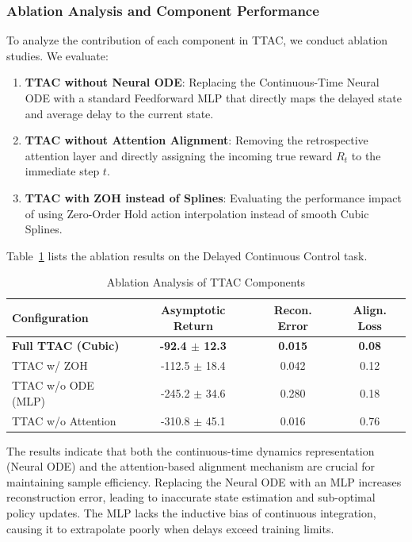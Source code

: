 \documentclass[manuscript, screen, review]{jair}
\begin{document}
\subsubsection{Ablation Analysis and Component Performance}
To analyze the contribution of each component in TTAC, we conduct ablation studies. We evaluate:
\begin{enumerate}
    \item \textbf{TTAC without Neural ODE}: Replacing the Continuous-Time Neural ODE with a standard Feedforward MLP that directly maps the delayed state and average delay to the current state.
    \item \textbf{TTAC without Attention Alignment}: Removing the retrospective attention layer and directly assigning the incoming true reward $R_t$ to the immediate step $t$.
    \item \textbf{TTAC with ZOH instead of Splines}: Evaluating the performance impact of using Zero-Order Hold action interpolation instead of smooth Cubic Splines.
\end{enumerate}

Table~\ref{tab:ablation} lists the ablation results on the Delayed Continuous Control task.

\begin{table}[!htbp]
\centering
\caption{Ablation Analysis of TTAC Components}
\label{tab:ablation}
\vskip 0.1in
\begin{small}
\begin{tabular}{lccc}
\toprule
\textbf{Configuration} & \textbf{Asymptotic Return} & \textbf{Recon. Error} & \textbf{Align. Loss} \\
\midrule
\textbf{Full TTAC (Cubic)} & \textbf{-92.4 $\pm$ 12.3} & \textbf{0.015} & \textbf{0.08} \\
TTAC w/ ZOH & -112.5 $\pm$ 18.4 & 0.042 & 0.12 \\
TTAC w/o ODE (MLP) & -245.2 $\pm$ 34.6 & 0.280 & 0.18 \\
TTAC w/o Attention & -310.8 $\pm$ 45.1 & 0.016 & 0.76 \\
\bottomrule
\end{tabular}
\end{small}
\end{table}

The results indicate that both the continuous-time dynamics representation (Neural ODE) and the attention-based alignment mechanism are crucial for maintaining sample efficiency. Replacing the Neural ODE with an MLP increases reconstruction error, leading to inaccurate state estimation and sub-optimal policy updates. The MLP lacks the inductive bias of continuous integration, causing it to extrapolate poorly when delays exceed training limits.
\end{document}
